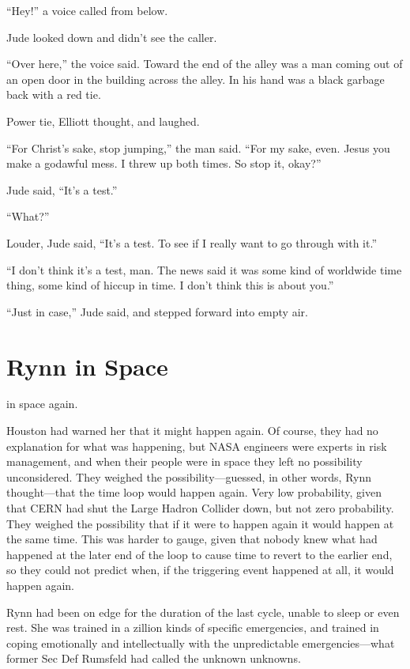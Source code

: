 “Hey!” a voice called from below.

Jude looked down and didn’t see the caller.

“Over here,” the voice said. Toward the end of the alley was a man coming out of an open door in the building across the alley. In his hand was a black garbage back with a red tie.

Power tie, Elliott thought, and laughed.

“For Christ’s sake, stop jumping,” the man said. “For my sake, even. Jesus you make a godawful mess. I threw up both times. So stop it, okay?”

Jude said, “It’s a test.”

“What?”

Louder, Jude said, “It’s a test. To see if I really want to go through with it.”

“I don’t think it’s a test, man. The news said it was some kind of worldwide time thing, some kind of hiccup in time. I don’t think this is about you.”

“Just in case,” Jude said, and stepped forward into empty air.



\chapter{Rynn in Space}

 in space again.

Houston had warned her that it might happen again. Of course, they had no explanation for what was happening, but NASA engineers were experts in risk management, and when their people were in space they left no possibility unconsidered. They weighed the possibility—guessed, in other words, Rynn thought—that the time loop would happen again. Very low probability, given that CERN had shut the Large Hadron Collider down, but not zero probability. They weighed the possibility that if it were to happen again it would happen at the same time. This was harder to gauge, given that nobody knew what had happened at the later end of the loop to cause time to revert to the earlier end, so they could not predict when, if the triggering event happened at all, it would happen again.

Rynn had been on edge for the duration of the last cycle, unable to sleep or even rest. She was trained in a zillion kinds of specific emergencies, and trained in coping emotionally and intellectually with the unpredictable emergencies—what former Sec Def Rumsfeld had called the unknown unknowns.

